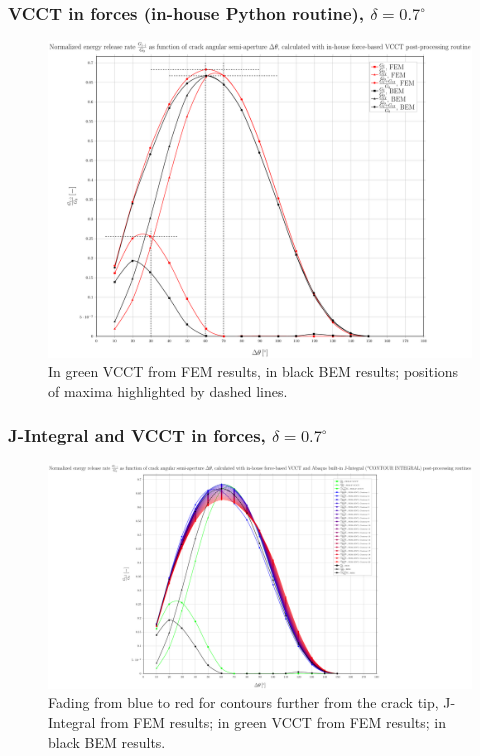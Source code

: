 \documentclass[first,firstsupp,lastsupp,handout,last,hyperref,table]{ETHclass}
\begin{document}
\begin{frame}
\frametitle{\small VCCT in forces (in-house Python routine), $\delta=0.7^{\circ}$}
\vspace{-0.5cm}
\centering
\captionsetup[figure]{font=scriptsize,labelfont=scriptsize}
\begin{figure}[!h]
\centering
\includegraphics[height=0.7\textheight]{2017-07-10_AbqRunSummary_SmallStrainD07_M-F-VCCT_Summary.pdf}
  \caption{\scriptsize In green VCCT from FEM results, in black BEM results; positions of maxima highlighted by dashed lines.}
  \label{fig:res1}
\end{figure}
\end{frame}

\begin{frame}
\frametitle{\small J-Integral and VCCT in forces, $\delta=0.7^{\circ}$}
\vspace{-0.5cm}
\centering
\captionsetup[figure]{font=scriptsize,labelfont=scriptsize}
\begin{figure}[!h]
\centering
\includegraphics[height=0.7\textheight]{2017-07-10_AbqRunSummary_SmallStrainD07_F-VCCT-JINT_Summary.pdf}
  \caption{\scriptsize Fading from blue to red for contours further from the crack tip, J-Integral from FEM results; in green VCCT from FEM results; in black BEM results.}
  \label{fig:res1}
\end{figure}
\end{frame}
\end{document}
